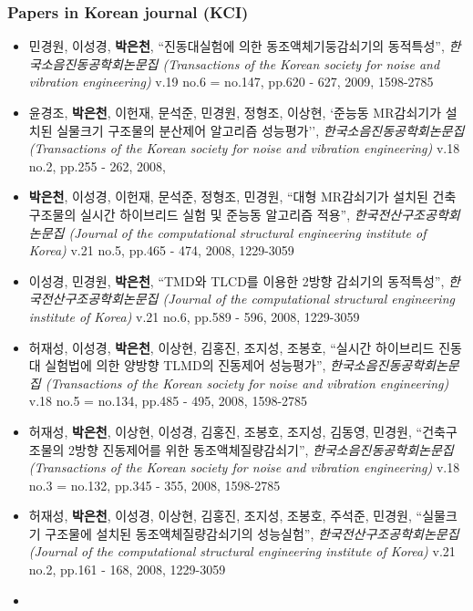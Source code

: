 \subsubsection*{Papers in Korean journal (KCI)}
\begin{itemize}
\item[]
  민경원, 이성경, \textbf{박은천}, ``진동대실험에 의한
  동조액체기둥감쇠기의 동적특성'', \emph{한국소음진동공학회논문집
  (Transactions of the Korean society for noise and vibration
  engineering)} v.19 no.6 = no.147, pp.620 - 627, 2009, 1598-2785
\item[]
  윤경조, \textbf{박은천}, 이헌재, 문석준, 민경원, 정형조, 이상현, `준능동 MR감쇠기가 설치된 실물크기 구조물의 분산제어 알고리즘 성능평가'', \emph{한국소음진동공학회논문집
  (Transactions of the Korean society for noise and vibration
  engineering)} v.18 no.2, pp.255 - 262, 2008,
\item[]
  \textbf{박은천}, 이성경, 이헌재, 문석준, 정형조, 민경원, ``대형
  MR감쇠기가 설치된 건축구조물의 실시간 하이브리드 실험 및 준능동
  알고리즘 적용'', \emph{한국전산구조공학회논문집 (Journal of the
  computational structural engineering institute of Korea)} v.21 no.5,
  pp.465 - 474, 2008, 1229-3059
\item[]
  이성경, 민경원, \textbf{박은천}, ``TMD와 TLCD를 이용한 2방향 감쇠기의
  동적특성'', \emph{한국전산구조공학회논문집 (Journal of the
  computational structural engineering institute of Korea)} v.21 no.6,
  pp.589 - 596, 2008, 1229-3059
\item[]
  허재성, 이성경, \textbf{박은천}, 이상현, 김홍진, 조지성, 조봉호,
  ``실시간 하이브리드 진동대 실험법에 의한 양방향 TLMD의 진동제어
  성능평가'', \emph{한국소음진동공학회논문집 (Transactions of the Korean
  society for noise and vibration engineering)} v.18 no.5 = no.134,
  pp.485 - 495, 2008, 1598-2785
\item[]
  허재성, \textbf{박은천}, 이상현, 이성경, 김홍진, 조봉호, 조지성,
  김동영, 민경원, ``건축구조물의 2방향 진동제어를 위한
  동조액체질량감쇠기'', \emph{한국소음진동공학회논문집 (Transactions of
  the Korean society for noise and vibration engineering)} v.18 no.3 =
  no.132, pp.345 - 355, 2008, 1598-2785
\item[]
  허재성, \textbf{박은천}, 이성경, 이상현, 김홍진, 조지성, 조봉호,
  주석준, 민경원, ``실물크기 구조물에 설치된 동조액체질량감쇠기의
  성능실험'', \emph{한국전산구조공학회논문집 (Journal of the
  computational structural engineering institute of Korea)} v.21 no.2,
  pp.161 - 168, 2008, 1229-3059
\item[]

\end{itemize}
